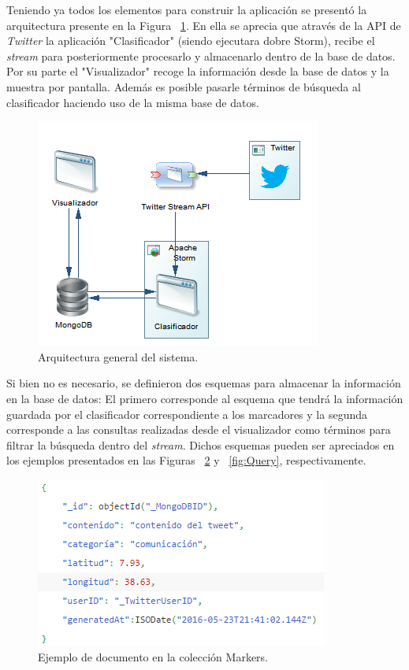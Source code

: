 Teniendo ya todos los elementos para construir la aplicación se presentó la arquitectura presente en la Figura ~\ref{fig:arquitecturaGeneral}. En ella se aprecia que através de la API de \textit{Twitter} la aplicación "Clasificador" (siendo ejecutara dobre Storm), recibe el \textit{stream} para posteriormente procesarlo y almacenarlo dentro de la base de datos. Por su parte el "Visualizador" recoge la información desde la base de datos y la muestra por pantalla. Además es posible pasarle términos de búsqueda al clasificador haciendo uso de la misma base de datos. \\

	\begin{figure}[H]
		\centering
		\captionsetup{justification=centering}
		\includegraphics[scale=0.8]{images/arquitecturaGeneral.png}
		\caption[Arquitectura general del sistema.]{Arquitectura general del sistema.}
		\label{fig:arquitecturaGeneral}
	\end{figure}


Si bien no es necesario, se definieron dos esquemas para almacenar la información en la base de datos: El primero corresponde al esquema que tendrá la información guardada por el clasificador correspondiente a los marcadores y la segunda corresponde a las consultas realizadas desde el visualizador como términos para filtrar la búsqueda dentro del \textit{stream}. Dichos esquemas pueden ser apreciados en los ejemplos presentados en las Figuras ~\ref{fig:Marker} y ~\ref{fig:Query}, respectivamente.\\


\begin{figure}[H]
	\centering
	\captionsetup{justification=centering}
	\includegraphics[scale=0.8]{images/marker.png}
	\caption[Ejemplo de documento en la colección Markers.]{Ejemplo de documento en la colección Markers.}
	\label{fig:Marker}
\end{figure}

